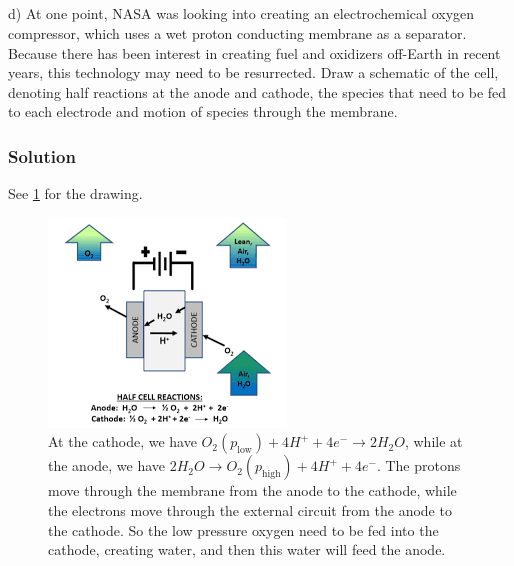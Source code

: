 \documentclass[12pt]{article}
\begin{document}
\subsection{}
d) At one point, NASA was looking into creating an electrochemical oxygen compressor, which uses a wet proton conducting membrane as a separator. Because there has been interest in creating fuel and oxidizers off-Earth in recent years, this technology may need to be resurrected. Draw a schematic of the cell, denoting half reactions at the anode and cathode, the species that need to be fed to each electrode and motion of species through the membrane.
\subsubsection{Solution}
See \ref{eoc} for the drawing.
\begin{figure}[h!]
    \centering
    \includegraphics[width=\textwidth]{EOC.png}
    \caption{At the cathode, we have $O_{2}(p_\text{low}) + 4 H^{+} + 4 e^{-} \rightarrow 2 H_{2}O$, while at the anode, we have $2 H_{2}O \rightarrow O_{2}(p_\text{high}) + 4 H^{+} + 4 e^{-}$. The protons move through the membrane from the anode to the cathode, while the electrons move through the external circuit from the anode to the cathode. So the low pressure oxygen need to be fed into the cathode, creating water, and then this water will feed the anode.}
\label{eoc}
\end{figure}
\end{document}
